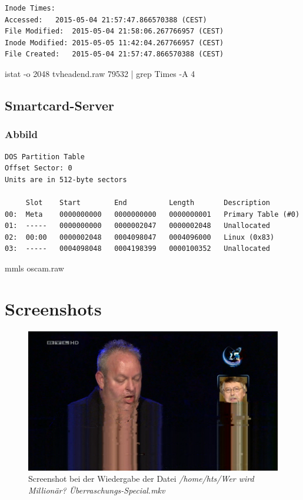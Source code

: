 \begin{cmd}
\begin{verbatim}
Inode Times:
Accessed:	2015-05-04 21:57:47.866570388 (CEST)
File Modified:	2015-05-04 21:58:06.267766957 (CEST)
Inode Modified:	2015-05-05 11:42:04.267766957 (CEST)
File Created:	2015-05-04 21:57:47.866570388 (CEST)
\end{verbatim}
\caption{istat -o 2048 tvheadend.raw 79532 | grep Times -A 4}
\label{cmd:tvheadend-rtlhdaccess}
\end{cmd}

\subsection{Smartcard-Server}

\subsubsection{Abbild}

\begin{cmd}[H]
\begin{verbatim}
DOS Partition Table
Offset Sector: 0
Units are in 512-byte sectors

     Slot    Start        End          Length       Description
00:  Meta    0000000000   0000000000   0000000001   Primary Table (#0)
01:  -----   0000000000   0000002047   0000002048   Unallocated
02:  00:00   0000002048   0004098047   0004096000   Linux (0x83)
03:  -----   0004098048   0004198399   0000100352   Unallocated
\end{verbatim}
\caption{mmls oscam.raw}
\label{cmd:oscam-mmls}
\end{cmd}

\section{Screenshots}

\begin{figure}
\includegraphics[scale=0.5]{rtlhd-millionaer.png} 
\caption{Screenshot bei der Wiedergabe der Datei \textit{/home/hts/Wer wird Millionär? Überraschungs-Special.mkv}}
\label{fig:tvheadend-rtlhd}
\end{figure}
